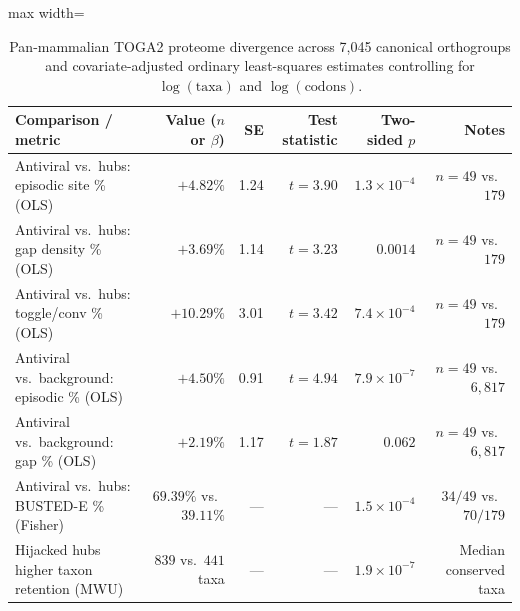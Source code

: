 \begin{table}[htbp]
\centering
\caption{Pan-mammalian TOGA2 proteome divergence across 7,045 canonical orthogroups and covariate-adjusted ordinary least-squares estimates controlling for $\log(\text{taxa})$ and $\log(\text{codons})$.}
\label{tab:s4_tier2_toga2}
\footnotesize
\setlength{\tabcolsep}{4.5pt}
\begin{adjustbox}{max width=\textwidth}
\begin{tabular}{@{}l r r r r r@{}}
\toprule
Comparison / metric & Value ($n$ or $\beta$) & SE & Test statistic & Two-sided $p$ & Notes \\
\midrule
Antiviral vs.\ hubs: episodic site \% (OLS) & $+4.82\%$ & 1.24 & $t=3.90$ & $1.3\times 10^{-4}$ & $n=49$ vs.\ $179$ \\
Antiviral vs.\ hubs: gap density \% (OLS) & $+3.69\%$ & 1.14 & $t=3.23$ & $0.0014$ & $n=49$ vs.\ $179$ \\
Antiviral vs.\ hubs: toggle/conv \% (OLS) & $+10.29\%$ & 3.01 & $t=3.42$ & $7.4\times 10^{-4}$ & $n=49$ vs.\ $179$ \\
Antiviral vs.\ background: episodic \% (OLS) & $+4.50\%$ & 0.91 & $t=4.94$ & $7.9\times 10^{-7}$ & $n=49$ vs.\ $6,817$ \\
Antiviral vs.\ background: gap \% (OLS) & $+2.19\%$ & 1.17 & $t=1.87$ & $0.062$ & $n=49$ vs.\ $6,817$ \\
Antiviral vs.\ hubs: BUSTED-E \% (Fisher) & $69.39\%$ vs.\ $39.11\%$ & --- & --- & $1.5\times 10^{-4}$ & $34/49$ vs.\ $70/179$ \\
Hijacked hubs higher taxon retention (MWU) & $839$ vs.\ $441$ taxa & --- & --- & $1.9\times 10^{-7}$ & Median conserved taxa \\
\bottomrule
\end{tabular}
\end{adjustbox}
\end{table}
